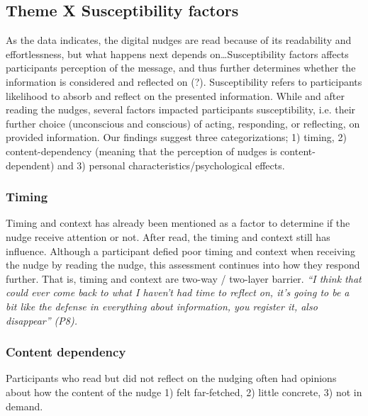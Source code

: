 \subsection{Theme X Susceptibility factors}
As the data indicates, the digital nudges are read because of its readability and effortlessness, but what happens next depends on…Susceptibility factors affects participants perception of the message, and thus further determines whether the information is considered and reflected on (?). Susceptibility refers to participants likelihood to absorb and reflect on the presented information. While and after reading the nudges, several factors impacted participants susceptibility, i.e. their further choice (unconscious and conscious) of acting, responding, or reflecting, on provided information. Our findings suggest three categorizations; 1) timing, 2) content-dependency (meaning that the perception of nudges is content-dependent) and 3) personal characteristics/psychological effects. 

\subsubsection{Timing}
Timing and context has already been mentioned as a factor to determine if the nudge receive attention or not. After read, the timing and context still has influence. Although a participant defied poor timing and context when receiving the nudge by reading the nudge, this assessment continues into how they respond further. That is, timing and context are two-way / two-layer barrier. \textit{“I think that could ever come back to what I haven't had time to reflect on, it's going to be a bit like the defense in everything about information, you register it, also disappear” (P8).}

\subsubsection{Content dependency}
Participants who read but did not reflect on the nudging often had opinions about how the content of the nudge 1) felt far-fetched, 2) little concrete, 3) not in demand.

